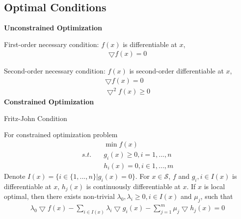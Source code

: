 \documentclass[runningheads]{llncs}
\begin{document}
\subsection{Optimal Conditions}
\par\noindent
\textbf{Unconstrained Optimization}
\par
First-order necessary condition:
$f(x)$ is differentiable at $x$, 
\begin{align}
    \bigtriangledown f(x) = 0
\end{align}
\par
Second-order necessary condition:
$f(x)$ is second-order differentiable at $x$,
\begin{align}
    \bigtriangledown f(x) = 0 \\
    \bigtriangledown^2 f(x) \geq 0
\end{align}
\noindent
\textbf{Constrained Optimization}


\begin{theorem}{Fritz-John Condition}
    \par
    For constrained optimization problem
    \begin{align}
        & \min f(x) \\
        s.t.\quad & g_i(x) \geq 0, i = 1,..., n \\
        & h_i(x) = 0, i \in 1, ..., m
    \end{align}
    Denote $I(x) = \{i \in \{1,...,n\} | g_i(x) = 0\}$.
    For $x \in \mathcal{S}$, $f$ and $g_i, i \in I(x)$
    is differentiable at $x$, $h_j(x)$ is continuously
    differentiable at $x$.
    If $x$ is local optimal, then there exists non-trivial
    $\lambda_0, \lambda_i \geq 0, i \in I(x)$
    and $\mu_j$, such that
    \begin{align}
        \lambda_0 \bigtriangledown f(x) - \sum_{i \in I(x)} \lambda_i
        \bigtriangledown g_i(x) - \sum_{j=1}^m \mu_j
        \bigtriangledown h_j(x) = 0
    \end{align}
\end{theorem}
\end{document}
